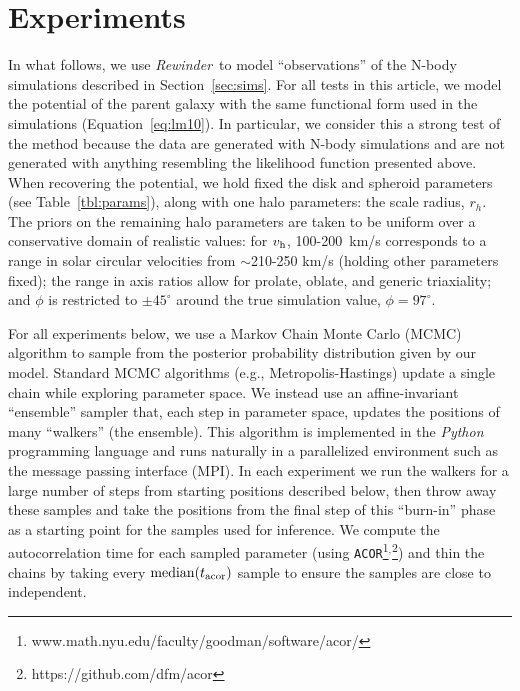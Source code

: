 \documentclass[letterpaper,12pt,preprint]{aastex}
\newcommand{\project}[1]{\textsl{#1}}
\newcommand{\vhalo}{v_{\rm h}}
\newcommand{\rewinder}{\emph{Rewinder}}
\begin{document}
\section{Experiments} \label{sec:experiments}
In what follows, we use \rewinder\ to model ``observations'' of the N-body simulations described in Section~\ref{sec:sims}. For all tests in this article, we model the potential of the parent galaxy with the same functional form used in the simulations (Equation~\ref{eq:lm10}). In particular, we consider this a strong test of the method because the data are generated with N-body simulations and are not generated with anything resembling the likelihood function presented above. When recovering the potential, we hold fixed the disk and spheroid parameters (see Table~\ref{tbl:params}), along with one halo parameters: the scale radius, $r_h$. The priors on the remaining halo parameters are taken to be uniform over a conservative domain of realistic values: for $\vhalo$, 100-200~km/s corresponds to a range in solar circular velocities from $\sim$210-250 km/s (holding other parameters fixed); the range in axis ratios allow for prolate, oblate, and generic triaxiality; and $\phi$ is restricted to $\pm45^\circ$ around the true simulation value, $\phi = 97^\circ$.

For all experiments below, we use a Markov Chain Monte Carlo (MCMC) algorithm to sample from the posterior probability distribution given by our model. Standard MCMC algorithms (e.g., Metropolis-Hastings) update a single chain while exploring parameter space. We instead use an affine-invariant ``ensemble'' sampler \citep{goodman10} that, each step in parameter space, updates the positions of many ``walkers'' (the ensemble). This algorithm is implemented in the \project{Python} programming language \citep{foremanmackey13} and runs naturally in a parallelized environment such as the message passing interface (MPI). In each experiment we run the walkers for a large number of steps from starting positions described below, then throw away these samples and take the positions from the final step of this ``burn-in'' phase as a starting point for the samples used for inference. We compute the autocorrelation time for each sampled parameter (using \texttt{ACOR}\footnote{www.math.nyu.edu/faculty/goodman/software/acor/}$^{,}$\footnote{https://github.com/dfm/acor}) and thin the chains by taking every $\mathrm{median}(t_{\rm acor})$ sample to ensure the samples are close to independent.
\end{document}
